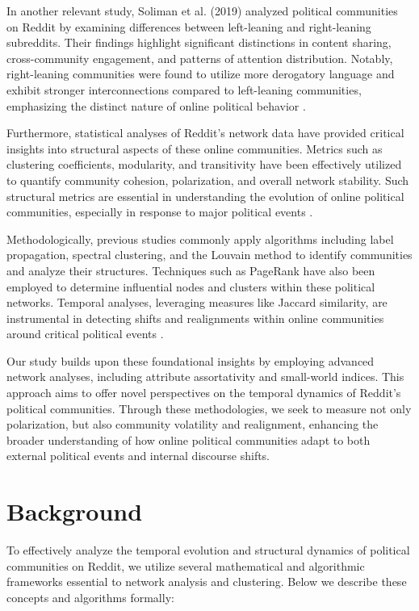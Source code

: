 \documentclass{article}
\theoremstyle{definition}
\begin{document}
In another relevant study, Soliman et al. (2019) analyzed political communities on Reddit by examining differences between left-leaning and right-leaning subreddits. Their findings highlight significant distinctions in content sharing, cross-community engagement, and patterns of attention distribution. Notably, right-leaning communities were found to utilize more derogatory language and exhibit stronger interconnections compared to left-leaning communities, emphasizing the distinct nature of online political behavior \cite{soliman2019characterization}.

Furthermore, statistical analyses of Reddit’s network data have provided critical insights into structural aspects of these online communities. Metrics such as clustering coefficients, modularity, and transitivity have been effectively utilized to quantify community cohesion, polarization, and overall network stability. Such structural metrics are essential in understanding the evolution of online political communities, especially in response to major political events \cite{statisticalanalysisnetwork}.

Methodologically, previous studies commonly apply algorithms including label propagation, spectral clustering, and the Louvain method to identify communities and analyze their structures. Techniques such as PageRank have also been employed to determine influential nodes and clusters within these political networks. Temporal analyses, leveraging measures like Jaccard similarity, are instrumental in detecting shifts and realignments within online communities around critical political events \cite{soliman2019characterization}.

Our study builds upon these foundational insights by employing advanced network analyses, including attribute assortativity and small-world indices. This approach aims to offer novel perspectives on the temporal dynamics of Reddit’s political communities. Through these methodologies, we seek to measure not only polarization, but also community volatility and realignment, enhancing the broader understanding of how online political communities adapt to both external political events and internal discourse shifts.


\section{Background}

To effectively analyze the temporal evolution and structural dynamics of political communities on Reddit, we utilize several mathematical and algorithmic frameworks essential to network analysis and clustering. Below we describe these concepts and algorithms formally:
\end{document}
